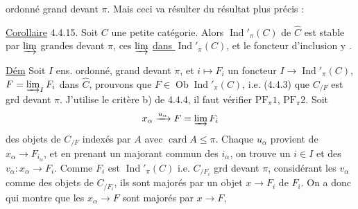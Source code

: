 ordonné grand devant $\pi$. Mais ceci va résulter du résultat plus précis :

\uline{Corollaire} 4.4.15. Soit $C$ une petite catégorie. Alors  $\operatorname{Ind}'_\pi(C)$  de $\widehat C$ est stable  par $\varinjlim$ grandes devant $\pi$,    ces $\varinjlim$  \uline{dans $\operatorname{Ind}'_\pi(C)$}, et le foncteur d'inclusion y .

\uline{Dém} Soit $I$ ens. ordonné, grand devant $\pi$, et  $i\longmapsto F_i$ un foncteur $I\to\operatorname{Ind}'_\pi(C)$, $F=\varinjlim_I F_i$ dans $\widehat C$, prouvons que $F\in\operatorname{Ob}\operatorname{Ind}'_\pi(C)$, i.e. (4.4.3) que $C_{/F}$ est grd devant $\pi$. J'utilise le critère b) de 4.4.4, il faut vérifier $\mathrm{PF}_{\pi}1$, $\mathrm{PF}_{\pi}2$. Soit
\[
x_\alpha\xrightarrow{u_\alpha}F=\varinjlim F_i
\]
des objets de $C_{/F}$ indexés par $A$ avec $\operatorname{card} A\leq\pi$. Chaque $u_\alpha$ provient de $x_\alpha\to F_{i_\alpha}$, et en prenant un majorant commun des $i_\alpha$,  on trouve un $i\in I$ et des $v_\alpha:x_\alpha\to F_i$. Comme $F_i$ est  $\operatorname{Ind}'_\pi(C)$ i.e. $C_{/F_i}$ grd devant $\pi$, considérant les $v_\alpha$ comme des objets de $C_{/F_i}$, ils sont majorés par un objet $x\longrightarrow F_i$ de $F_i$. On a donc
qui montre que les $x_\alpha\longrightarrow F$ sont majorés par $x\to F$,
